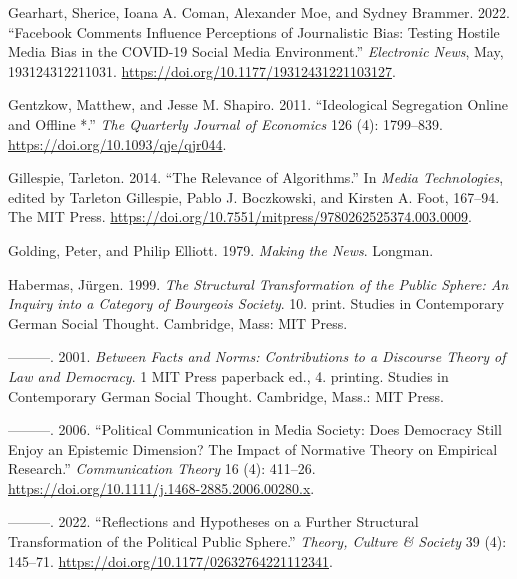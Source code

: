 \documentclass[
]{article}
\newlength{\cslhangindent}
\newlength{\cslentryspacingunit} %
\newenvironment{CSLReferences}[2] %
 {%
  \setlength{\parindent}{0pt}
  \ifodd #1
  \let\oldpar\par
  \def\par{\hangindent=\cslhangindent\oldpar}
  \fi
  \setlength{\parskip}{#2\cslentryspacingunit}
 }%
 {}
\begin{document}
\begin{CSLReferences}{1}{0}
\leavevmode{}%
Gearhart, Sherice, Ioana A. Coman, Alexander Moe, and Sydney Brammer.
2022. {``Facebook {Comments} {Influence} {Perceptions} of {Journalistic}
{Bias}: {Testing} {Hostile} {Media} {Bias} in the {COVID}-19 {Social}
{Media} {Environment}.''} \emph{Electronic News}, May, 193124312211031.
\url{https://doi.org/10.1177/19312431221103127}.

\leavevmode{}%
Gentzkow, Matthew, and Jesse M. Shapiro. 2011. {``Ideological
{Segregation} {Online} and {Offline} *.''} \emph{The Quarterly Journal
of Economics} 126 (4): 1799--839.
\url{https://doi.org/10.1093/qje/qjr044}.

\leavevmode{}%
Gillespie, Tarleton. 2014. {``The {Relevance} of {Algorithms}.''} In
\emph{Media {Technologies}}, edited by Tarleton Gillespie, Pablo J.
Boczkowski, and Kirsten A. Foot, 167--94. The MIT Press.
\url{https://doi.org/10.7551/mitpress/9780262525374.003.0009}.

\leavevmode{}%
Golding, Peter, and Philip Elliott. 1979. \emph{Making the {News}}.
Longman.

\leavevmode{}%
Habermas, Jürgen. 1999. \emph{The {Structural} Transformation of the
Public Sphere: An Inquiry into a Category of Bourgeois Society}. 10.
print. Studies in Contemporary {German} Social Thought. Cambridge, Mass:
MIT Press.

\leavevmode{}%
---------. 2001. \emph{Between Facts and Norms: Contributions to a
Discourse Theory of Law and Democracy}. 1 MIT Press paperback ed., 4.
printing. Studies in Contemporary {German} Social Thought. Cambridge,
Mass.: MIT Press.

\leavevmode{}%
---------. 2006. {``Political {Communication} in {Media} {Society}:
{Does} {Democracy} {Still} {Enjoy} an {Epistemic} {Dimension}? {The}
{Impact} of {Normative} {Theory} on {Empirical} {Research}.''}
\emph{Communication Theory} 16 (4): 411--26.
\url{https://doi.org/10.1111/j.1468-2885.2006.00280.x}.

\leavevmode{}%
---------. 2022. {``Reflections and {Hypotheses} on a {Further}
{Structural} {Transformation} of the {Political} {Public} {Sphere}.''}
\emph{Theory, Culture \& Society} 39 (4): 145--71.
\url{https://doi.org/10.1177/02632764221112341}.


\end{CSLReferences}
\end{document}

